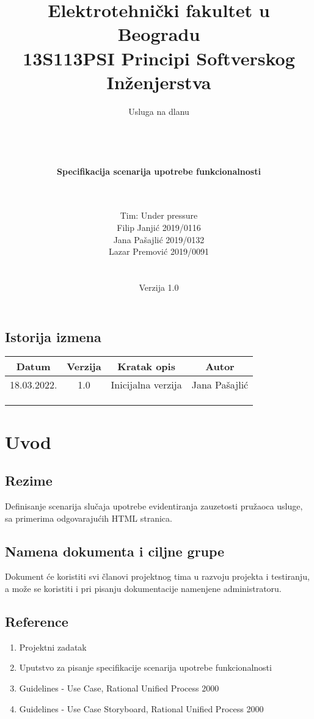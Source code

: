 \documentclass[a4paper,12pt]{report}
\title{\Large Elektrotehnički fakultet u Beogradu \\ 13S113PSI Principi Softverskog Inženjerstva}
\author{\Huge Usluga na dlanu\\ \ \\ \ \\ \ \\ \ \\
	\Large \textbf{Specifikacija scenarija upotrebe funkcionalnosti}\\\Large \textbf{\genitivfunkcionalnosti} \\ \ \\}
\date{\Large   Tim: Under pressure \\ Filip Janjić 2019/0116 \\ Jana Pašajlić 2019/0132 \\ Lazar Premović 2019/0091  \\ \  \\ \  \\\large Verzija 1.0}
\newcommand{\genitivfunkcionalnosti}{evidentiranja zauzetosti pružaoca usluge}
\newcommand{\inicijalniautor}{Jana Pašajlić}
\newcommand{\inicijalnidatum}{18.03.2022.}
\begin{document}
\maketitle

\begin{center}
\section*{Istorija izmena}
\begin{tabular}{ |c|c|c|c| }
\hline
\textbf{Datum} & \textbf{Verzija} & \textbf{Kratak opis} & \textbf{Autor} \\ 
\hline
 \inicijalnidatum & 1.0  & Inicijalna verzija & \inicijalniautor \\
 \hline
 &  & &  \\
 \hline
 &  &  &  \\
 \hline
 &  &  &  \\
 \hline
\end{tabular}
\end{center}
\newpage

\tableofcontents

\newpage
\section{Uvod}
\subsection{Rezime}
    Definisanje scenarija slučaja upotrebe \genitivfunkcionalnosti, sa primerima odgovarajućih HTML stranica.
\subsection{Namena dokumenta i ciljne grupe}
    Dokument će koristiti svi članovi projektnog tima u razvoju projekta i testiranju, a može se koristiti i pri pisanju dokumentacije namenjene administratoru.
\subsection{Reference}
 \begin{enumerate}
    \item Projektni zadatak
    \item Uputstvo za pisanje specifikacije scenarija upotrebe funkcionalnosti 
    \item Guidelines - Use Case, Rational Unified Process 2000
    \item Guidelines - Use Case Storyboard, Rational Unified Process 2000
 \end{enumerate}
\end{document}
